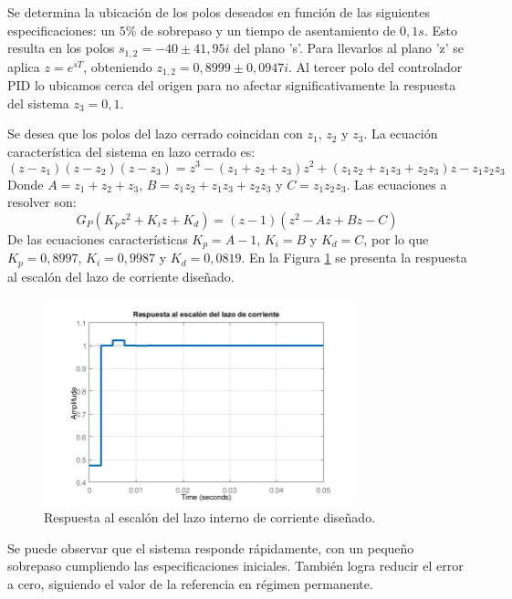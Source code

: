 Se determina la ubicación de los polos deseados en función de las siguientes especificaciones: un $5\%$ de sobrepaso y un tiempo de asentamiento de $0,1s$. Esto resulta en los polos $s_{1,2}=-40\pm 41,95i$ del plano 's'. Para llevarlos al plano 'z' se aplica $z=e^{sT}$, obteniendo $z_{1,2}=0,8999\pm 0,0947i$. Al tercer polo del controlador PID lo ubicamos cerca del origen para no afectar significativamente la respuesta del sistema $z_3=0,1$.\par 
Se desea que los polos del lazo cerrado coincidan con $z_1$, $z_2$ y $z_3$. La ecuación característica del sistema en lazo cerrado es:
\begin{equation}
(z-z_1)(z-z_2)(z-z_3)=z^3-(z_1+z_2+z_3)z^2+(z_1z_2+z_1z_3+z_2z_3)z-z_1z_2z_3
\end{equation}
Donde $A=z_1+z_2+z_3$, $B=z_1z_2+z_1z_3+z_2z_3$ y $C=z_1z_2z_3$. Las ecuaciones a resolver son:
\begin{equation}
G_P(K_pz^2+K_iz+K_d)=(z-1)(z^2-Az+Bz-C)
\end{equation}
De las ecuaciones características $K_p=A-1$, $K_i=B$ y $K_d=C$, por lo que $K_p=0,8997$, $K_i=0,9987$ y $K_d=0,0819$. En la Figura  \ref{F:Resp_lazo_corriente} se presenta la respuesta al escalón del lazo de corriente diseñado.
\begin{figure} [H]
	\centering
	\includegraphics[width=0.8\textwidth]{./imagenes/Resp_lazo_corriente.jpg}
	\caption{Respuesta al escalón del lazo interno de corriente diseñado.}
	\label{F:Resp_lazo_corriente}
\end{figure} \par 
Se puede observar que el sistema responde rápidamente, con un pequeño sobrepaso cumpliendo las especificaciones iniciales. También logra reducir el error a cero, siguiendo el valor de la referencia en régimen permanente. \par 

